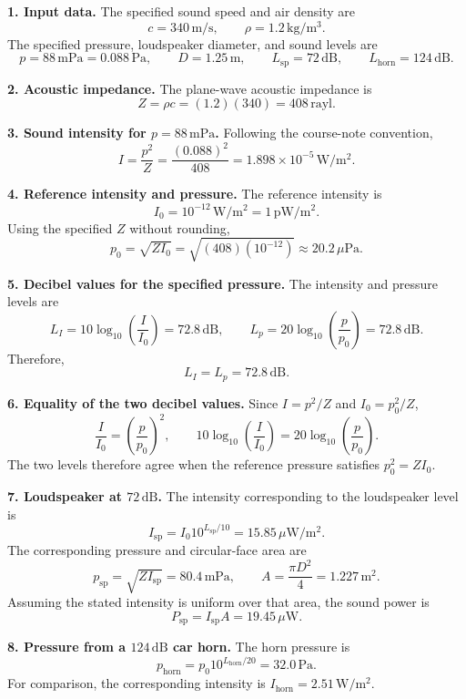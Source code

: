 \begingroup
\setlength{\abovedisplayskip}{6pt}
\setlength{\belowdisplayskip}{6pt}
\setlength{\abovedisplayshortskip}{4pt}
\setlength{\belowdisplayshortskip}{4pt}
\setlength{\intextsep}{6pt}

\textbf{1. Input data.} The specified sound speed and air density are
\[
\boxed{c=340\,\mathrm{m/s},\qquad \rho=1.2\,\mathrm{kg/m^3}.}
\]
The specified pressure, loudspeaker diameter, and sound levels are
\[
\boxed{p=88\,\mathrm{mPa}=0.088\,\mathrm{Pa},\qquad
D=1.25\,\mathrm{m},\qquad L_{\mathrm{sp}}=72\,\mathrm{dB},\qquad
L_{\mathrm{horn}}=124\,\mathrm{dB}.}
\]

\textbf{2. Acoustic impedance.} The plane-wave acoustic impedance is
\[
Z=\rho c=(1.2)(340)=\boxed{408\,\mathrm{rayl}.}
\]

\textbf{3. Sound intensity for $p=88\,\mathrm{mPa}$.} Following the course-note convention,
\[
I=\frac{p^2}{Z}=\frac{(0.088)^2}{408}
  =\boxed{1.898\times10^{-5}\,\mathrm{W/m^2}}.
\]

\textbf{4. Reference intensity and pressure.} The reference intensity is
\[
\boxed{I_0=10^{-12}\,\mathrm{W/m^2}=1\,\mathrm{pW/m^2}.}
\]
Using the specified $Z$ without rounding,
\[
p_0=\sqrt{ZI_0}=\sqrt{(408)(10^{-12})}
 \approx\boxed{20.2\,\mu\mathrm{Pa}}.
\]

\textbf{5. Decibel values for the specified pressure.} The intensity and pressure levels are
\[
L_I=10\log_{10}\left(\frac{I}{I_0}\right)=72.8\,\mathrm{dB},
\qquad
L_p=20\log_{10}\left(\frac{p}{p_0}\right)=72.8\,\mathrm{dB}.
\]
Therefore,
\[
\boxed{L_I=L_p=72.8\,\mathrm{dB}.}
\]

\textbf{6. Equality of the two decibel values.} Since $I=p^2/Z$ and $I_0=p_0^2/Z$,
\[
\frac{I}{I_0}=\left(\frac{p}{p_0}\right)^2,
\qquad
10\log_{10}\left(\frac{I}{I_0}\right)=20\log_{10}\left(\frac{p}{p_0}\right).
\]
The two levels therefore agree when the reference pressure satisfies $p_0^2=ZI_0$.

\textbf{7. Loudspeaker at $72\,\mathrm{dB}$.} The intensity corresponding to the loudspeaker level is
\[
I_{\mathrm{sp}}=I_0 10^{L_{\mathrm{sp}}/10}
 =\boxed{15.85\,\mu\mathrm{W/m^2}}.
\]
The corresponding pressure and circular-face area are
\[
p_{\mathrm{sp}}=\sqrt{ZI_{\mathrm{sp}}}=\boxed{80.4\,\mathrm{mPa}},
\qquad
A=\frac{\pi D^2}{4}=1.227\,\mathrm{m^2}.
\]
Assuming the stated intensity is uniform over that area, the sound power is
\[
P_{\mathrm{sp}}=I_{\mathrm{sp}}A=\boxed{19.45\,\mu\mathrm{W}}.
\]

\textbf{8. Pressure from a $124\,\mathrm{dB}$ car horn.} The horn pressure is
\[
p_{\mathrm{horn}}=p_0 10^{L_{\mathrm{horn}}/20}
 =\boxed{32.0\,\mathrm{Pa}}.
\]
For comparison, the corresponding intensity is $I_{\mathrm{horn}}=2.51\,\mathrm{W/m^2}$.

